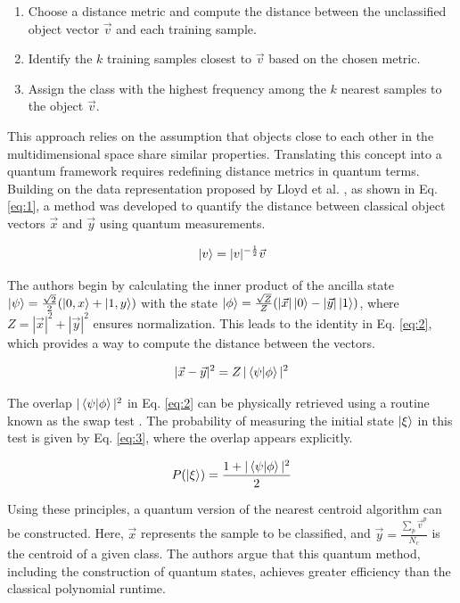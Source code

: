 \documentclass{article}
\begin{document}
\begin{enumerate}
    \item Choose a distance metric and compute the distance between the unclassified object vector $\vec{v}$ and each training sample.
    \item Identify the $k$ training samples closest to $\vec{v}$ based on the chosen metric.
    \item Assign the class with the highest frequency among the $k$ nearest samples to the object $\vec{v}$.
\end{enumerate}

This approach relies on the assumption that objects close to each other in the multidimensional space share similar properties. Translating this concept into a quantum framework requires redefining distance metrics in quantum terms. Building on the data representation proposed by Lloyd et al. \cite{Lloyd2013}, as shown in Eq. \ref{eq:1}, a method was developed to quantify the distance between classical object vectors $\vec{x}$ and $\vec{y}$ using quantum measurements.

\begin{equation}
    \ket{v} = |v|^{-\frac{1}{2}} \vec{v}
    \label{eq:1}
\end{equation}

The authors begin by calculating the inner product of the ancilla state $\ket{\psi} = \frac{\sqrt{2}}{2} (\ket{0, x} + \ket{1,y})$ with the state $\ket{\phi} = \frac{\sqrt{Z}}{Z}(|\vec{x}|\ket{0} - |\vec{y}|\ket{1})$, where $Z = |\vec{x}|^2 + |\vec{y}|^2$ ensures normalization. This leads to the identity in Eq. \ref{eq:2}, which provides a way to compute the distance between the vectors.

\begin{equation}
    |\vec{x} - \vec{y}|^2 = Z \, |\braket{\psi | \phi}|^2
    \label{eq:2}
\end{equation}

The overlap $|\braket{\psi | \phi}|^2$ in Eq. \ref{eq:2} can be physically retrieved using a routine known as the swap test \cite{swaptest}. The probability of measuring the initial state $\ket{\xi}$ in this test is given by Eq. \ref{eq:3}, where the overlap appears explicitly.

\begin{equation}
    P(\ket{\xi}) = \frac{1 + |\braket{\psi | \phi}|^2}{2}
    \label{eq:3}
\end{equation}

Using these principles, a quantum version of the nearest centroid algorithm can be constructed. Here, $\vec{x}$ represents the sample to be classified, and $\vec{y} = \frac{\sum_p \vec{v}^p}{N_c}$ is the centroid of a given class. The authors argue that this quantum method, including the construction of quantum states, achieves greater efficiency than the classical polynomial runtime.
\end{document}
